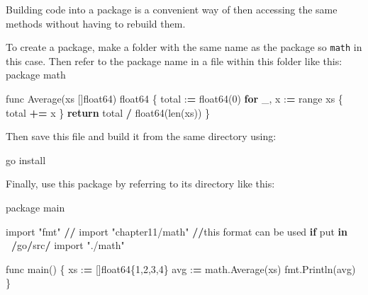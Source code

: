 \documentclass[]{book}
\newenvironment{Shaded}{\begin{snugshade}}{\end{snugshade}}
\newcommand{\KeywordTok}[1]{\textcolor[rgb]{0.13,0.29,0.53}{\textbf{#1}}}
\newcommand{\DecValTok}[1]{\textcolor[rgb]{0.00,0.00,0.81}{#1}}
\newcommand{\StringTok}[1]{\textcolor[rgb]{0.31,0.60,0.02}{#1}}
\newcommand{\ImportTok}[1]{#1}
\newcommand{\ControlFlowTok}[1]{\textcolor[rgb]{0.13,0.29,0.53}{\textbf{#1}}}
\newcommand{\OperatorTok}[1]{\textcolor[rgb]{0.81,0.36,0.00}{\textbf{#1}}}
\newcommand{\BuiltInTok}[1]{#1}
\newcommand{\NormalTok}[1]{#1}
\begin{document}
Building code into a package is a convenient way of then accessing the
same methods without having to rebuild them.

To create a package, make a folder with the same name as the package so
\texttt{math} in this case. Then refer to the package name in a file
within this folder like this: package math

\begin{Shaded}
\begin{Highlighting}[]
\NormalTok{func Average(xs []float64) float64 \{}
\NormalTok{    total :}\OperatorTok{=}\NormalTok{ float64(}\DecValTok{0}\NormalTok{)             }
    \ControlFlowTok{for}\NormalTok{ _, x :}\OperatorTok{=} \BuiltInTok{range}\NormalTok{ xs \{          }
\NormalTok{        total }\OperatorTok{+=}\NormalTok{ x                  }
\NormalTok{    \}                               }
    \ControlFlowTok{return}\NormalTok{ total }\OperatorTok{/}\NormalTok{ float64(}\BuiltInTok{len}\NormalTok{(xs)) }
\NormalTok{\}                                   }
\end{Highlighting}
\end{Shaded}

Then save this file and build it from the same directory using:

\begin{Shaded}
\begin{Highlighting}[]
\NormalTok{go install}
\end{Highlighting}
\end{Shaded}

Finally, use this package by referring to its directory like this:

\begin{Shaded}
\begin{Highlighting}[]
\NormalTok{package main                          }
                                      
\ImportTok{import} \StringTok{"fmt"}                          
\OperatorTok{//} \ImportTok{import} \StringTok{"chapter11/math"} \OperatorTok{//}\NormalTok{this }\BuiltInTok{format}\NormalTok{ can be used }\ControlFlowTok{if}\NormalTok{ put }\KeywordTok{in} \OperatorTok{~/}\NormalTok{go}\OperatorTok{/}\NormalTok{src}\OperatorTok{/}
\ImportTok{import} \StringTok{"./math"}                       
                                      
\NormalTok{func main() \{                         }
\NormalTok{    xs :}\OperatorTok{=}\NormalTok{ []float64\{}\DecValTok{1}\NormalTok{,}\DecValTok{2}\NormalTok{,}\DecValTok{3}\NormalTok{,}\DecValTok{4}\NormalTok{\}          }
\NormalTok{    avg :}\OperatorTok{=}\NormalTok{ math.Average(xs)           }
\NormalTok{    fmt.Println(avg)                  }
\NormalTok{\}                                     }
\end{Highlighting}
\end{Shaded}
\end{document}
